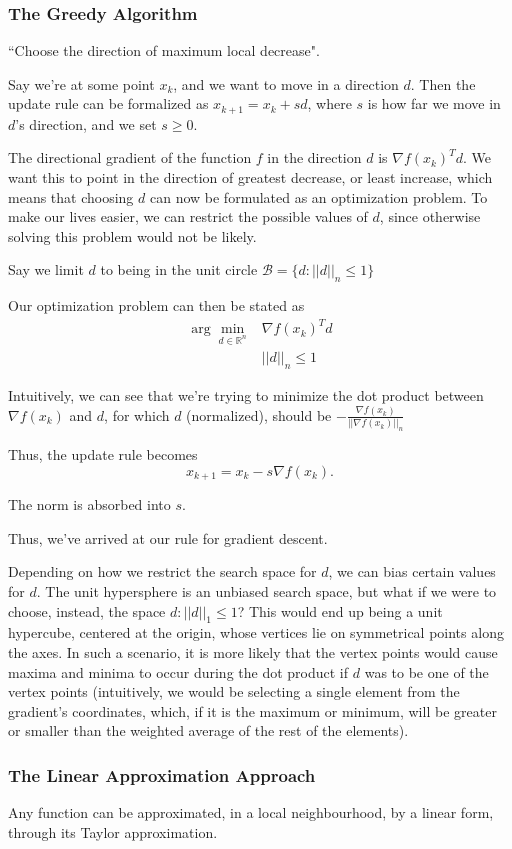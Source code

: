 \documentclass[twocolumn, 11pt]{article}
\begin{document}
\subsubsection*{The Greedy Algorithm}

``Choose the direction of maximum local decrease".

Say we're at some point $x_k$, and we want to move in a direction $d$. Then the update rule can be formalized as $x_{k+1} = x_k + sd$, where $s$ is how far we move in $d$'s direction, and we set $s \geq 0$.

The directional gradient of the function $f$ in the direction $d$ is $\nabla f(x_k)^T d$. We want this to point in the direction of greatest decrease, or least increase, which means that choosing $d$ can now be formulated as an optimization problem. To make our lives easier, we can restrict the possible values of $d$, since otherwise solving this problem would not be likely.

Say we limit $d$ to being in the unit circle $\mathcal{B} = \{ d : ||d||_{n} \leq 1 \}$

Our optimization problem can then be stated as
\begin{align*}
  \arg\min \limits_{d \in \mathbb R^n} &\nabla f(x_k)^Td \\ 
                                       & ||d||_{n} \leq 1
\end{align*}


Intuitively, we can see that we're trying to minimize the dot product between $\nabla f(x_k)$ and $d$, for which $d$ (normalized), should be $-\frac{\nabla f(x_k)}{||\nabla f(x_k)||_{n}}$

Thus, the update rule becomes 
\[ 
x_{k+1} = x_k - s\nabla f(x_k)
.\]

The norm is absorbed into $s$.

Thus, we've arrived at our rule for gradient descent.


Depending on how we restrict the search space for $d$, we can bias certain values for $d$. The unit hypersphere is an unbiased search space, but what if we were to choose, instead, the space $d : ||d||_1 \leq 1$? This would end up being a unit hypercube, centered at the origin, whose vertices lie on symmetrical points along the axes. In such a scenario, it is more likely that the vertex points would cause maxima and minima to occur during the dot product if $d$ was to be one of the vertex points (intuitively, we would be selecting a single element from the gradient's coordinates, which, if it is the maximum or minimum, will be greater or smaller than the weighted average of the rest of the elements).

\subsubsection*{The Linear Approximation Approach}

Any function can be approximated, in a local neighbourhood, by a linear form, through its Taylor approximation.
\end{document}
